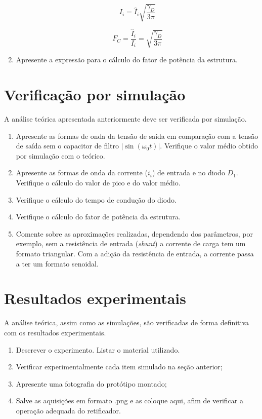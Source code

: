 \begin{enumerate}
	\begin{equation}\label{eq:Iieficaz}
	{I_i} = {{\hat I}_i }\sqrt {\frac{{{\gamma _D}}}{{3\pi }}} 
	\end{equation}
	
	\begin{equation}\label{eq:FatorCrista}
	{F_C} = \frac{{{{\hat I}_i }}}{{{I_i}}} = \sqrt {\frac{{{\gamma _D}}}{{3\pi }}} 
	\end{equation}
	
	\item Apresente a expressão para o cálculo do fator de potência da estrutura.
	
\end{enumerate}


\section{Verificação por simulação}


A análise teórica apresentada anteriormente deve ser verificada por simulação.
\begin{enumerate}									
	\item   Apresente as formas de onda da tensão de saída em comparação com a tensão de saída sem o capacitor de filtro $|\sin(\omega_0 t)|$. Verifique o valor médio obtido por simulação com o teórico.
	\item   Apresente as formas de onda da corrente ($i_i$) de entrada e no diodo $D_1$. Verifique o cálculo do valor de pico e do valor médio.
	\item   Verifique o cálculo do tempo de condução do diodo.
	\item   Verifique o cálculo do fator de potência da estrutura.
	\item  Comente sobre as aproximações realizadas, dependendo dos parâmetros, por exemplo, sem a resistência de entrada (\emph{shunt}) a corrente de carga tem um formato triangular. Com a adição da resistência de entrada, a corrente passa a ter um formato senoidal.
\end{enumerate}





\section{Resultados experimentais}


A análise teórica, assim como as simulações, são verificadas de forma definitiva com os resultados experimentais.
\begin{enumerate}									
	\item   Descrever o experimento. Listar o material utilizado.  
	\item  Verificar experimentalmente cada item simulado na seção anterior;
	\item  Apresente uma fotografia do protótipo montado;
	\item  Salve as aquisições em formato .png e as coloque aqui, afim de verificar a operação adequada do retificador.
\end{enumerate}

